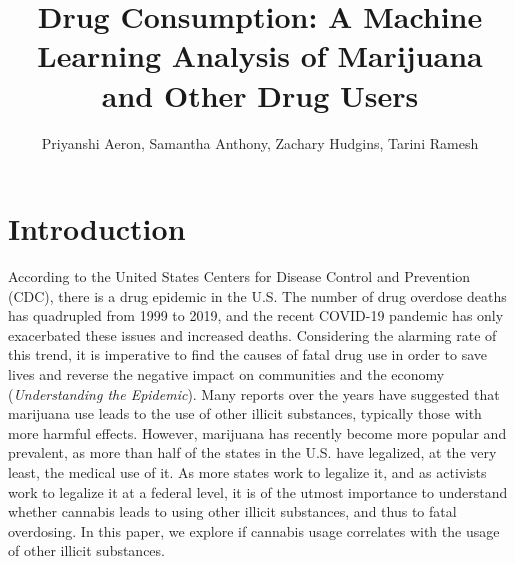\documentclass{article}
\title{Drug Consumption: A Machine Learning Analysis of Marijuana 
and Other Drug Users}
\author{Priyanshi Aeron, Samantha Anthony, Zachary Hudgins, Tarini Ramesh}
\date{}
\begin{document}
\maketitle
\vspace*{-8mm}
\section{Introduction}
\vspace*{-2mm}
According to the United States Centers for Disease Control and Prevention (CDC), there is a drug epidemic in the U.S. The number of drug overdose deaths has quadrupled from 1999 to 2019, and the recent COVID-19 pandemic has only exacerbated these issues and increased deaths. Considering the alarming rate of this trend, it is imperative to find the causes of fatal drug use in order to save lives and reverse the negative impact on communities and the economy ({\it Understanding the Epidemic}).
Many reports over the years have suggested that marijuana use leads to the use of other illicit substances, typically those with more harmful effects. However, marijuana has recently become more popular and prevalent, as more than half of the states in the U.S. have legalized, at the very least, the medical use of it. As more states work to legalize it, and as activists work to legalize it at a federal level, it is of the utmost importance to understand whether cannabis leads to using other illicit substances, and thus to fatal overdosing. In this paper, we explore if cannabis usage correlates with the usage of other illicit substances.


\vspace*{-4mm}
\end{document}
